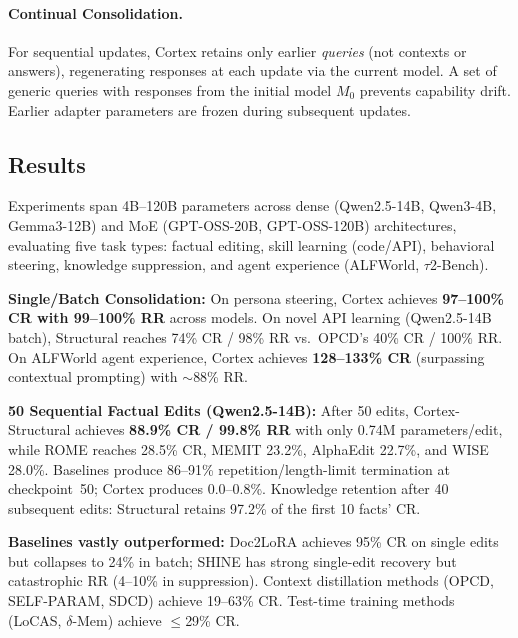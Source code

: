 \documentclass[11pt,a4paper]{article}
\begin{document}
\paragraph{Continual Consolidation.}
For sequential updates, Cortex retains only earlier \emph{queries} (not contexts or answers), regenerating responses at each update via the current model. A set of generic queries with responses from the initial model $M_0$ prevents capability drift. Earlier adapter parameters are frozen during subsequent updates.

\subsection{Results}
Experiments span 4B--120B parameters across dense (Qwen2.5-14B, Qwen3-4B, Gemma3-12B) and MoE (GPT-OSS-20B, GPT-OSS-120B) architectures, evaluating five task types: factual editing, skill learning (code/API), behavioral steering, knowledge suppression, and agent experience (ALFWorld, $\tau$2-Bench).

\textbf{Single/Batch Consolidation:} On persona steering, Cortex achieves \textbf{97--100\% CR with 99--100\% RR} across models. On novel API learning (Qwen2.5-14B batch), Structural reaches 74\% CR / 98\% RR vs.\ OPCD's 40\% CR / 100\% RR. On ALFWorld agent experience, Cortex achieves \textbf{128--133\% CR} (surpassing contextual prompting) with $\sim$88\% RR.

\textbf{50 Sequential Factual Edits (Qwen2.5-14B):} After 50 edits, Cortex-Structural achieves \textbf{88.9\% CR / 99.8\% RR} with only 0.74M parameters/edit, while ROME reaches 28.5\% CR, MEMIT 23.2\%, AlphaEdit 22.7\%, and WISE 28.0\%. Baselines produce 86--91\% repetition/length-limit termination at checkpoint~50; Cortex produces 0.0--0.8\%. Knowledge retention after 40 subsequent edits: Structural retains 97.2\% of the first 10 facts' CR.

\textbf{Baselines vastly outperformed:} Doc2LoRA achieves 95\% CR on single edits but collapses to 24\% in batch; SHINE has strong single-edit recovery but catastrophic RR (4--10\% in suppression). Context distillation methods (OPCD, SELF-PARAM, SDCD) achieve 19--63\% CR. Test-time training methods (LoCAS, $\delta$-Mem) achieve $\leq$29\% CR.
\end{document}
